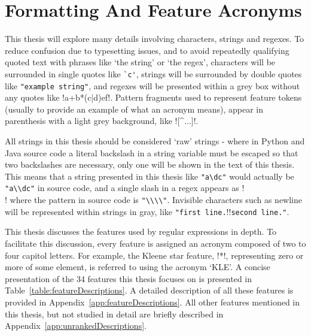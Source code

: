 \section{Formatting And Feature Acronyms}
This thesis will explore many details involving characters, strings and regexes.  To reduce confusion due to typesetting issues, and to avoid repeatedly qualifying quoted text with phrases like `the string' or `the regex', characters will be surrounded in single quotes like \verb!`c'!, strings will be surrounded by double quotes like \verb!"example string"!, and regexes will be presented within a grey box without any quotes like \cverb!a+b*(c|d)e\1f!.  Pattern fragments used to represent feature tokens (usually to provide an example of what an acronym means), appear in parenthesis with a light grey background, like \bverb![^...]!.

All strings in this thesis should be considered `raw' strings - where in Python and Java source code a literal backslash in a string variable must be escaped so that two backslashes are necessary, only one will be shown in the text of this thesis.  This means that a string presented in this thesis like \verb!"a\dc"! would actually be \verb!"a\\dc"! in source code, and a single slash in a regex appears as \cverb!\\! where the pattern in source code is \verb!"\\\\"!.  Invisible characters such as newline will be represented within strings in gray, like \verb!"first line.!\gverb!\n!\verb!second line."!.

This thesis discusses the features used by regular expressions in depth.  To facilitate this discussion, every feature is assigned an acronym composed of two to four capitol letters.  For example, the Kleene star feature, \bverb!*!, representing zero or more of some element, is referred to using the acronym `KLE'.  A concise presentation of the 34 features this thesis focuses on is presented in Table~\ref{table:featureDescriptions}.  A detailed description of all these features is provided in Appendix~\ref{app:featureDescriptions}.  All other features mentioned in this thesis, but not studied in detail are briefly described in Appendix~\ref{app:unrankedDescriptions}.
